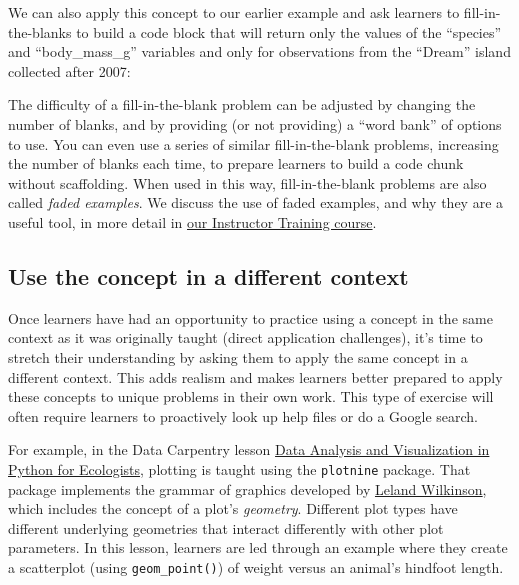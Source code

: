 \documentclass[
]{book}
\newenvironment{Shaded}{\begin{snugshade}}{\end{snugshade}}
\newcommand{\DecValTok}[1]{\textcolor[rgb]{0.00,0.00,0.81}{#1}}
\newcommand{\KeywordTok}[1]{\textcolor[rgb]{0.13,0.29,0.53}{\textbf{#1}}}
\newcommand{\NormalTok}[1]{#1}
\newcommand{\OperatorTok}[1]{\textcolor[rgb]{0.81,0.36,0.00}{\textbf{#1}}}
\newcommand{\StringTok}[1]{\textcolor[rgb]{0.31,0.60,0.02}{#1}}
\begin{document}
We can also apply this concept to our earlier example and ask learners to fill-in-the-blanks
to build a code block that will return only the values of the ``species'' and ``body\_mass\_g''
variables and only for observations from the ``Dream'' island collected after 2007:

\begin{Shaded}
\end{Shaded}

The difficulty of a fill-in-the-blank problem can be adjusted by changing the number of blanks,
and by providing (or not providing) a ``word bank'' of options to use. You can even use a series
of similar fill-in-the-blank problems, increasing the number of blanks each time, to prepare
learners to build a code chunk without scaffolding. When used in this way, fill-in-the-blank
problems are also called \emph{faded examples}. We discuss the use of faded examples, and why they
are a useful tool, in more detail in
\href{https://carpentries.github.io/instructor-training/05-memory/index.html}{our Instructor Training course}.

\hypertarget{use-the-concept-in-a-different-context}{%
\subsection{Use the concept in a different context}\label{use-the-concept-in-a-different-context}}

Once learners have had an opportunity to practice using a concept in the same context as
it was originally taught (direct application challenges), it's time to stretch their
understanding by asking them to apply the same concept in a different context. This adds
realism and makes learners better prepared to apply these concepts to unique
problems in their own work. This type of exercise will often require learners to proactively
look up help files or do a Google search.

For example, in the Data Carpentry lesson \href{https://datacarpentry.org/python-ecology-lesson/07-visualization-ggplot-python/index.html}{Data Analysis and Visualization in Python for Ecologists},
plotting is taught using the \texttt{plotnine} package. That package implements the grammar of graphics developed by
\href{https://en.wikipedia.org/wiki/Leland_Wilkinson}{Leland Wilkinson}, which includes the concept
of a plot's \emph{geometry}. Different plot types have different underlying geometries that interact
differently with other plot parameters. In this lesson, learners are led through an example
where they create a scatterplot (using \texttt{geom\_point()}) of weight versus an animal's hindfoot
length.
\end{document}

